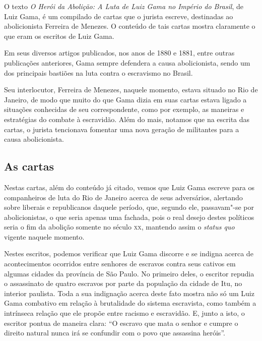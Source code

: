\documentclass[12pt]{extarticle}
\begin{document}
O texto \emph{O Herói da Abolição: A Luta de Luiz Gama no Império do
Brasil}, de Luiz Gama, é um compilado de cartas que o jurista escreve,
destinadas ao abolicionista Ferreira de Menezes. O conteúdo de tais
cartas mostra claramente o que eram os escritos de Luiz Gama.




Em seus diversos artigos publicados, nos anos de 1880 e 1881, entre
outras publicações anteriores, Gama sempre defendera a causa
abolicionista, sendo um dos principais bastiões na luta contra o
escravismo no Brasil.

Seu interlocutor, Ferreira de Menezes, naquele momento, estava situado
no Rio de Janeiro, de modo que muito do que Gama dizia em suas cartas
estava ligado a situações conhecidas de seu correspondente, como por
exemplo, as maneiras e estratégias do combate à escravidão. Além do
mais, notamos que na escrita das cartas, o jurista tencionava fomentar
uma nova geração de militantes para a causa abolicionista.

\subsection{As cartas}

Nestas cartas, além do conteúdo já citado, vemos que Luiz Gama escreve
para os companheiros de luta do Rio de Janeiro acerca de seus
adversários, alertando sobre liberais e republicanos daquele período,
que, segundo ele, passavam"-se por abolicionistas, o que seria apenas uma
fachada, pois o real desejo destes políticos seria o fim da abolição
somente no século \textsc{xx}, mantendo assim o \textit{status quo} vigente naquele
momento.










Nestes escritos, podemos verificar que Luiz Gama discorre e se indigna
acerca de acontecimentos ocorridos entre senhores de escravos contra
seus cativos em algumas cidades da província de São Paulo. No primeiro
deles, o escritor repudia o assassinato de quatro escravos por parte da
população da cidade de Itu, no interior paulista. Toda a sua indignação
acerca deste fato mostra não só um Luiz Gama combativo em relação à
brutalidade do sistema escravista, como também a intrínseca relação que
ele propõe entre racismo e escravidão. E, junto a isto, o escritor pontua
de maneira clara: ``O escravo que mata o senhor e cumpre o direito
natural nunca irá se confundir com o povo que assassina heróis''.
\end{document}

